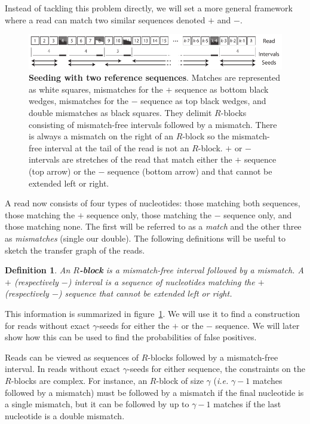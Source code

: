 \documentclass{article}
\newtheorem{definition}{Definition}
\begin{document}
Instead of tackling this problem directly, we will set a more general
framework where a read can match two similar sequences denoted $+$ and
$-$.

\begin{figure}[h]
\centering
\includegraphics[scale=0.88]{sketch_dual_mutations.pdf}
\caption{\textbf{Seeding with two reference sequences}.
Matches are represented as white squares, mismatches for the
$+$ sequence as bottom black wedges, mismatches for the $-$ sequence as
top black wedges, and double mismatches as black squares. They delimit
$R$-blocks consisting of mismatch-free intervals followed by a mismatch.
There is always a mismatch on the right of an $R$-block so the
mismatch-free interval at the tail of the read is not an $R$-block. $+$ or
$-$ intervals are stretches of the read that match either the
$+$ sequence (top arrow) or the $-$ sequence (bottom arrow) and that
cannot be extended left or right.}
\label{fig:sketchdual}
\end{figure}

A read now consists of four types of nucleotides: those matching both
sequences, those matching the $+$ sequence only, those matching the $-$
sequence only, and those matching none. The first will be referred to as a
\emph{match} and the other three as \emph{mismatches} (single our double).
The following definitions will be useful to sketch the transfer graph of
the reads.

\begin{definition}
An \textbf{$R$-block} is a mismatch-free interval followed by a
mismatch. A $+$ (respectively $-$) interval is a sequence of nucleotides
matching the $+$ (respectively $-$) sequence that cannot be extended left
or right.
\end{definition}

This information is summarized in figure~\ref{fig:sketchdual}. We will use
it to find a construction for reads without exact $\gamma$-seeds for
either the $+$ or the $-$ sequence. We will later show how this can be
used to find the probabilities of false positives.

Reads can be viewed as sequences of $R$-blocks followed by a mismatch-free
interval. In reads without exact $\gamma$-seeds for either sequence, the
constraints on the $R$-blocks are complex. For instance, an $R$-block of
size $\gamma$ (\textit{i.e.} $\gamma-1$ matches followed by a mismatch)
must be followed by a mismatch if the final nucleotide is a single
mismatch, but it can be followed by up to $\gamma-1$ matches if the last
nucleotide is a double mismatch.
\end{document}
